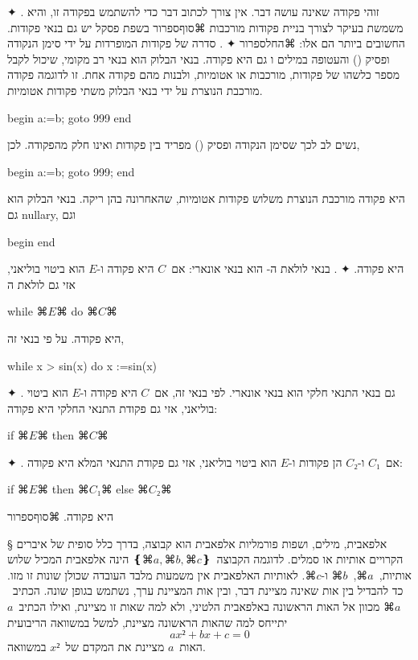   ✦ . זוהי פקודה שאינה עושה דבר. אין צורך לכתוב דבר כדי להשתמש בפקודה זו, והיא משמשת בעיקר לצורך בניית פקודות מורכבות
  ⌘סוף{ספרור}
  בשפת פסקל יש גם בנאי פקודות. החשובים ביותר הם אלו:
  ⌘החל{ספרור}
  ✦ . סדרה של פקודות המופרדות על ידי סימן הנקודה ופסיק ()
  והעטופה במילים  ו גם היא פקודה. בנאי הבלוק הוא בנאי רב
  מקומי, שיכול לקבל מספר כלשהו של פקודות, מורכבות או אטומיות, ולבנות מהם פקודה
  אחת. זו לדוגמה פקודה מורכבת הנוצרת על ידי בנאי הבלוק משתי פקודות אטומיות.
  \begin{PASCAL}
begin
  a:=b;
  goto 999
end
\end{PASCAL}
  נשים לב לכך שסימן הנקודה ופסיק () מפריד בין פקודות ואינו חלק מהפקודה.
  לכן,
  \begin{PASCAL}
begin
  a:=b;
  goto 999;
end
\end{PASCAL}
  היא פקודה מורכבת הנוצרת משלוש פקודות אטומיות, שהאחרונה בהן ריקה. בנאי הבלוק הוא גם nullary, וגם
  \begin{PASCAL}
begin
end
\end{PASCAL}
  היא פקודה.
  ✦ . בנאי לולאת ה- הוא בנאי אונארי: אם~$C$ היא פקודה ו-$E$ הוא ביטוי בוליאני, אזי גם לולאת ה
  \begin{PASCAL}
while ⌘$E$⌘ do ⌘$C$⌘
\end{PASCAL}
  היא פקודה. על פי בנאי זה,
  \begin{PASCAL}
while x > sin(x) do x :=sin(x)
\end{PASCAL}
  ✦ . גם בנאי התנאי חלקי הוא בנאי אונארי. לפי בנאי זה, אם~$C$ היא פקודה ו-$E$ הוא ביטוי בוליאני, אזי גם פקודת התנאי החלקי היא פקודה:
  \begin{PASCAL}
if ⌘$E$⌘ then ⌘$C$⌘
\end{PASCAL}
  ✦ . אם~$C₁$ ו-$C₂$ הן פקודות ו-$E$ הוא ביטוי בוליאני, אזי
  גם פקודת התנאי המלא היא פקודה:
  \begin{PASCAL}
if ⌘$E$⌘ then ⌘$C₁$⌘ else ⌘$C₂$⌘
\end{PASCAL}
  היא פקודה.
  ⌘סוף{ספרור}

§ אלפאבית, מילים, ושפות פורמליות
אלפאבית הוא קבוצה, בדרך כלל סופית של איברים הקרויים אותיות או סמלים. לדוגמה
הקבוצה~$❴⌘a,⌘b,⌘c❵$ הינה אלפאבית המכיל שלוש אותיות,~$⌘a$,~$⌘b$ ו-$⌘c$. לאותיות
האלפאבית אין משמעות מלבד העובדה שכולן שונות זו מזו. כד להבדיל בין אות שאינה
מציינת דבר, ובין אות המציינת
ערך, נשתמש בגופן שונה. הכתיב~$⌘a$ מכוון אל האות הראשונה באלפאבית הלטיני, ולא
למה שאות זו מציינת, ואילו הכתיב~$a$ יתייחס למה שהאות הראשונה מציינת, למשל
במשוואה הריבועית \[
 a x²+bx+c=0
\] האות~$a$ מציינת את המקדם של~$x²$ במשוואה.


